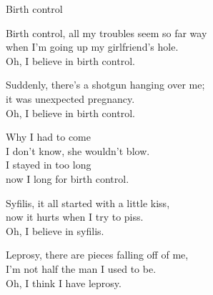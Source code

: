 \begin{song}{Birth control}
	

	
	Birth control, all my troubles seem so far way\\
	when I'm going up my girlfriend's hole.\\
	Oh, I believe in birth control.
	
	Suddenly, there's a shotgun hanging over me;\\
	it was unexpected pregnancy.\\
	Oh, I believe in birth control.
	
	Why I had to come\\
	I don't know, she wouldn't blow.\\
	I stayed in too long\\
	now I long for birth control.
	
	Syfilis, it all started with a little kiss,\\
	now it hurts when I try to piss.\\
	Oh, I believe in syfilis.
	
	Leprosy, there are pieces falling off of me,\\
	I'm not half the man I used to be.\\
	Oh, I think I have leprosy.
	
\end{song}
